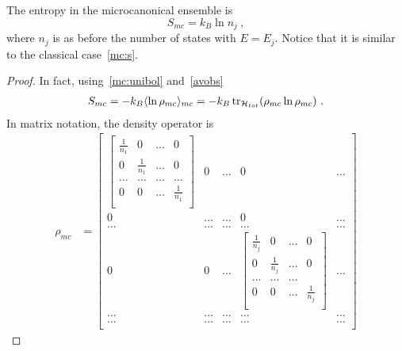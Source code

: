     The entropy in the microcanonical ensemble is 
    \begin{equation*}
        S_{mc} = k_B \ln n_j ~,
    \end{equation*}
    where $n_j$ is as before the number of states with $E = E_j$. Notice that it is similar to the classical case~\eqref{mc:s}.
    \begin{proof}
        In fact, using~\eqref{mc:unibol} and~\eqref{avobs}
        \begin{equation*}
        \begin{aligned}
            S_{mc} = - k_B \langle\ln \rho_{mc}\rangle_{mc} = - k_B \operatorname{tr}_{\mathcal H_{tot}} ( \rho_{mc} \ln \rho_{mc}) ~.
        \end{aligned}
        \end{equation*}
        In matrix notation, the density operator is 
        \begin{equation*}
        \begin{aligned}
            \rho_{mc} & = \begin{bmatrix}
                \begin{bmatrix}
                    \frac{1}{n_1} & 0 & \ldots & 0 \\
                    0 & \frac{1}{n_1} & \ldots & 0 \\
                    \ldots & \ldots & \ldots & \ldots \\
                    0 & 0 & \ldots & \frac{1}{n_1} \\
                \end{bmatrix} & 0 & \ldots & 0 & \ldots \\ 0 & 
                \ldots & \ldots & 0 & \ldots \\ 
                \ldots & \ldots & \ldots & \ldots & \ldots \\
                0 & 0 & \ldots & \begin{bmatrix}
                    \frac{1}{n_j} & 0 & \ldots & 0 \\
                    0 & \frac{1}{n_j} & \ldots & 0 \\
                    \ldots & \ldots & \ldots \\
                    0 & 0 & \ldots & \frac{1}{n_j} \\
                \end{bmatrix} & \ldots \\
                \ldots & \ldots & \ldots & \ldots & \ldots  \\
                \ldots & \ldots & \ldots & \ldots & \ldots \\

\end{bmatrix}
\end{aligned}
\end{equation*}
\end{proof}
